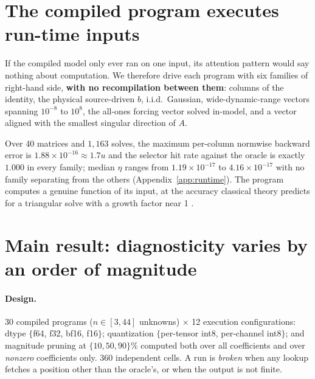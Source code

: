 \documentclass{article}
\theoremstyle{definition}
\newcommand{\bwe}{\ensuremath{\eta}}
\begin{document}
\section{The compiled program executes run-time inputs}\label{sec:runtime}

If the compiled model only ever ran on one input, its attention pattern would say
nothing about computation. We therefore drive each program with six families of
right-hand side, \textbf{with no recompilation between them}: columns of the
identity, the physical source-driven $b$, i.i.d.\ Gaussian, wide-dynamic-range
vectors spanning $10^{-8}$ to $10^{8}$, the all-ones forcing vector solved
in-model, and a vector aligned with the smallest singular direction of $A$.

Over 40 matrices and $1{,}163$ solves, the maximum per-column normwise backward
error is $1.88\times10^{-16}\approx1.7u$ and the selector hit rate against the
oracle is exactly $1.000$ in every family; median $\bwe$ ranges from
$1.19\times10^{-17}$ to $4.16\times10^{-17}$ with no family separating from the
others (Appendix~\ref{app:runtime}). The program computes a genuine function of
its input, at the accuracy classical theory predicts for a triangular solve with
a growth factor near 1 \citep{higham2002accuracy}.

\section{Main result: diagnosticity varies by an order of magnitude}\label{sec:main}

\paragraph{Design.} 30 compiled programs ($n\in[3,44]$ unknowns) $\times$ 12
execution configurations: dtype $\{$f64, f32, bf16, f16$\}$; quantization
$\{$per-tensor int8, per-channel int8$\}$; and magnitude pruning at
$\{10,50,90\}\%$ computed both over all coefficients and over \emph{nonzero}
coefficients only. 360 independent cells. A run is \emph{broken} when any lookup
fetches a position other than the oracle's, or when the output is not finite.
\end{document}
